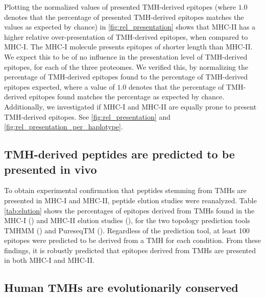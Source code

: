 Plotting the normalized values of presented TMH-derived epitopes (where
$1.0$ denotes that the percentage of presented TMH-derived epitopes
matches the values as expected by chance) in \ref{fig:rel_presentation}
shows that MHC-II has a higher relative over-presentation of TMH-derived
epitopes, when compared to MHC-I. 
The MHC-I molecule presents epitopes of shorter length than MHC-II.
We expect this to be of no influence in the presentation level
of TMH-derived epitopes, for each of the three proteomes.
We verified this, by normalizing the percentage of TMH-derived epitopes found
to the percentage of TMH-derived epitopes expected, 
where a value of $1.0$ denotes that the percentage of TMH-derived epitopes found
matches the percentage as expected by chance.
Additionally, we investigated if MHC-I and MHC-II are equally prone
to present TMH-derived epitopes. 
See \ref{fig:rel_presentation} and \ref{fig:rel_presentation_per_haplotype}.

\subsection{TMH-derived peptides are predicted to be presented in vivo}




To obtain experimental confirmation that peptides stemming from TMHs are presented in MHC-I and MHC-II,
peptide elution studies were reanalyzed.
Table \ref{tab:elution} shows the percentages of epitopes derived 
from TMHs
found in the MHC-I (\cite{schellens2015comprehensive}) and MHC-II elution 
studies  (\cite{bergseng2015different}),
for the two topology prediction tools TMHMM (\cite{krogh2001predicting}) and PureseqTM (\cite{wang2019efficient}). 
Regardless of the prediction tool, 
at least 100 epitopes were predicted to be derived from a TMH for each condition. 
From these findings, it is robustly predicted that
epitopes derived from TMHs are presented in both MHC-I and MHC-II.

\subsection{Human TMHs are evolutionarily conserved}

